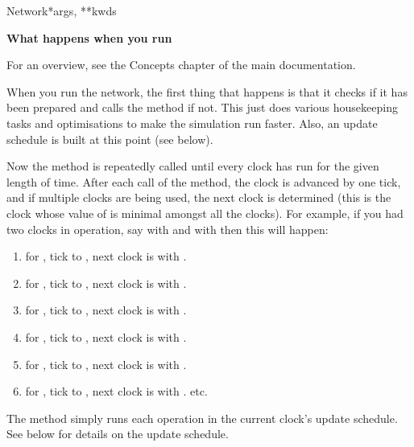 \documentclass[letterpaper,10pt,english]{manual}
\begin{document}
\begin{classdesc}{Network}{*args, **kwds}
\begin{description}
\end{description}

\textbf{What happens when you run}

For an overview, see the Concepts chapter of the main documentation.

When you run the network, the first thing that happens is that it
checks if it has been prepared and calls the  method
if not. This just does various housekeeping tasks and optimisations
to make the simulation run faster. Also, an update schedule is
built at this point (see below).

Now the  method is repeatedly called until every clock
has run for the given length of time. After each call of the
 method, the clock is advanced by one tick, and if
multiple clocks are being used, the next clock is determined (this
is the clock whose value of  is minimal amongst all the clocks).
For example, if you had two clocks in operation, say  with
 and  with  then this will happen:
\begin{enumerate}
\item {} 
 for , tick  to , next
clock is  with .

\item {} 
 for , tick  to , next
clock is  with .

\item {} 
 for , tick  to , next
clock is  with .

\item {} 
 for , tick  to , next
clock is  with .

\item {} 
 for , tick  to , next
clock is  with .

\item {} 
 for , tick  to , next
clock is  with . etc.

\end{enumerate}

The  method simply runs each operation in the current clock's
update schedule. See below for details on the update schedule.


\end{classdesc}
\end{document}
